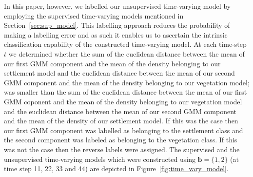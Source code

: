 \documentclass{article}
\begin{document}
In this paper, however, we labelled our unsupervised time-varying model by employing the supervised time-varying models mentioned in Section~\ref{sec:sup_model}. This labelling approach reduces the probability of making a labelling error and as such it enables us to ascertain the intrinsic classification capability of the constructed time-varying model. At each time-step $t$ we 
determined whether the sum of the euclidean distance between the mean of our first GMM component and the mean of the density belonging to our settlement model and the euclidean distance 
between the mean of our second GMM component and the mean of the density belonging to our vegetation model; was smaller than the sum of the euclidean distance between the mean of our first GMM coponent and the mean of the density 
belonging to our vegetation model and the euclidean distance between the mean of our second GMM component and the mean of the density of our settlement model. If this was the case then our first GMM component 
was labelled as belonging to the settlement class and the second component was labeled as belonging to the vegetation class. If this was not the case then 
the reverse labels were assigned. The supervised and the unsupervised time-varying models which were constructed using $\mathbf{b}=\{1,2\}$ (at time step 11, 22, 33 and 44) are depicted in Figure~\ref{fig:time_vary_model}.

% 


\end{document}
